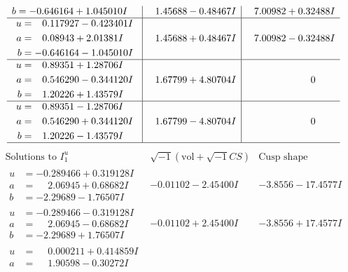 \documentclass[1p]{elsarticle_modified}
\theoremstyle{definition}
\newcommand{\I}{\sqrt{-1}}
\begin{document}
$$\begin{array}{c|c|c}
\begin{aligned}
b &= -0.646164 + 1.045010 I\end{aligned}
 & \phantom{-}1.45688 - 0.48467 I & \phantom{-}7.00982 + 0.32488 I \\ \hline\begin{aligned}
u &= \phantom{-}0.117927 - 0.423401 I \\
a &= \phantom{-}0.08943 + 2.01381 I \\
b &= -0.646164 - 1.045010 I\end{aligned}
 & \phantom{-}1.45688 + 0.48467 I & \phantom{-}7.00982 - 0.32488 I \\ \hline\begin{aligned}
u &= \phantom{-}0.89351 + 1.28706 I \\
a &= \phantom{-}0.546290 - 0.344120 I \\
b &= \phantom{-}1.20226 + 1.43579 I\end{aligned}
 & \phantom{-}1.67799 + 4.80704 I & \phantom{-0.000000 } 0 \\ \hline\begin{aligned}
u &= \phantom{-}0.89351 - 1.28706 I \\
a &= \phantom{-}0.546290 + 0.344120 I \\
b &= \phantom{-}1.20226 - 1.43579 I\end{aligned}
 & \phantom{-}1.67799 - 4.80704 I & \phantom{-0.000000 } 0\\
 \hline 
 \end{array}$$\newpage$$\begin{array}{c|c|c}  
\text{Solutions to }I^u_{1}& \I (\text{vol} + \sqrt{-1}CS) & \text{Cusp shape}\\
 \hline 
\begin{aligned}
u &= -0.289466 + 0.319128 I \\
a &= \phantom{-}2.06945 + 0.68682 I \\
b &= -2.29689 - 1.76507 I\end{aligned}
 & -0.01102 - 2.45400 I & -3.8556 - 17.4577 I \\ \hline\begin{aligned}
u &= -0.289466 - 0.319128 I \\
a &= \phantom{-}2.06945 - 0.68682 I \\
b &= -2.29689 + 1.76507 I\end{aligned}
 & -0.01102 + 2.45400 I & -3.8556 + 17.4577 I \\ \hline\begin{aligned}
u &= \phantom{-}0.000211 + 0.414859 I \\
a &= \phantom{-}1.90598 - 0.30272 I \\

\end{aligned}
\end{array}$$
\end{document}
